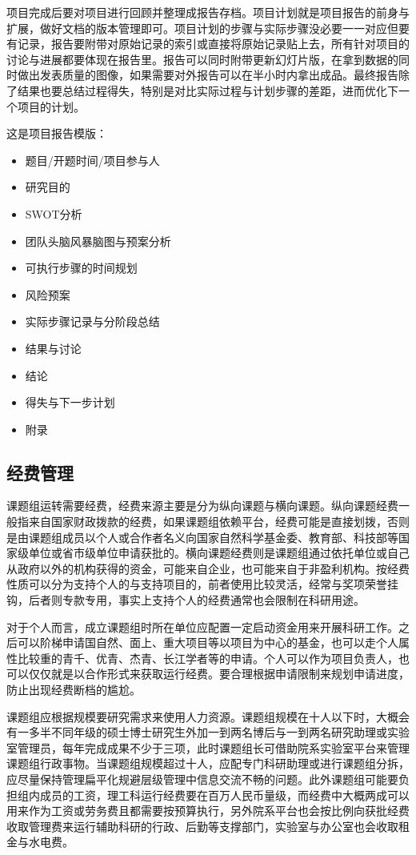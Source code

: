 \documentclass[]{tufte-book}
\providecommand{\tightlist}{%
  \setlength{\itemsep}{0pt}\setlength{\parskip}{0pt}}
\begin{document}
项目完成后要对项目进行回顾并整理成报告存档。项目计划就是项目报告的前身与扩展，做好文档的版本管理即可。项目计划的步骤与实际步骤没必要一一对应但要有记录，报告要附带对原始记录的索引或直接将原始记录贴上去，所有针对项目的讨论与进展都要体现在报告里。报告可以同时附带更新幻灯片版，在拿到数据的同时做出发表质量的图像，如果需要对外报告可以在半小时内拿出成品。最终报告除了结果也要总结过程得失，特别是对比实际过程与计划步骤的差距，进而优化下一个项目的计划。

这是项目报告模版：

\begin{itemize}
\tightlist
\item
  题目/开题时间/项目参与人
\item
  研究目的
\item
  SWOT分析
\item
  团队头脑风暴脑图与预案分析
\item
  可执行步骤的时间规划
\item
  风险预案
\item
  实际步骤记录与分阶段总结
\item
  结果与讨论
\item
  结论
\item
  得失与下一步计划
\item
  附录
\end{itemize}

\hypertarget{ux7ecfux8d39ux7ba1ux7406}{%
\subsection{经费管理}\label{ux7ecfux8d39ux7ba1ux7406}}

课题组运转需要经费，经费来源主要是分为纵向课题与横向课题。纵向课题经费一般指来自国家财政拨款的经费，如果课题组依赖平台，经费可能是直接划拨，否则是由课题组成员以个人或合作者名义向国家自然科学基金委、教育部、科技部等国家级单位或省市级单位申请获批的。横向课题经费则是课题组通过依托单位或自己从政府以外的机构获得的资金，可能来自企业，也可能来自于非盈利机构。按经费性质可以分为支持个人的与支持项目的，前者使用比较灵活，经常与奖项荣誉挂钩，后者则专款专用，事实上支持个人的经费通常也会限制在科研用途。

对于个人而言，成立课题组时所在单位应配置一定启动资金用来开展科研工作。之后可以阶梯申请国自然、面上、重大项目等以项目为中心的基金，也可以走个人属性比较重的青千、优青、杰青、长江学者等的申请。个人可以作为项目负责人，也可以仅仅就是以合作形式来获取运行经费。要合理根据申请限制来规划申请进度，防止出现经费断档的尴尬。

课题组应根据规模要研究需求来使用人力资源。课题组规模在十人以下时，大概会有一多半不同年级的硕士博士研究生外加一到两名博后与一到两名研究助理或实验室管理员，每年完成成果不少于三项，此时课题组长可借助院系实验室平台来管理课题组行政事物。当课题组规模超过十人，应配专门科研助理或进行课题组分拆，应尽量保持管理扁平化规避层级管理中信息交流不畅的问题。此外课题组可能要负担组内成员的工资，理工科运行经费要在百万人民币量级，而经费中大概两成可以用来作为工资或劳务费且都需要按预算执行，另外院系平台也会按比例向获批经费收取管理费来运行辅助科研的行政、后勤等支撑部门，实验室与办公室也会收取租金与水电费。
\end{document}

